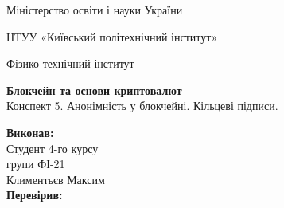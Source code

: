 \documentclass{article}
\begin{document}
    \begin{titlepage}
        \begin{center}

        Міністерство освіти і науки України
        
        НТУУ «Київський політехнічний інститут»
        
        Фізико-технічний інститут
        \vspace{3.3cm}
        
        {\textbf{Блокчейн та основи криптовалют}\\Конспект 5. Анонімність у блокчейні. Кільцеві підписи.}

        \vspace{8.5cm}

        \begin{flushright}
            \textbf{Виконав:}\\Студент 4-го курсу\\групи ФІ-21\\Климентьєв Максим\\
            \textbf{Перевірив:}\\\text{\_\_\_\_\_\_\_\_\_\_\_\_\_\_\_\_\_\_}
        \end{flushright}

        \end{center}
    \end{titlepage}
    \newpage

    \tableofcontents
    \cleardoublepage
    \setcounter{page}{3}

    \newpage
\end{document}
